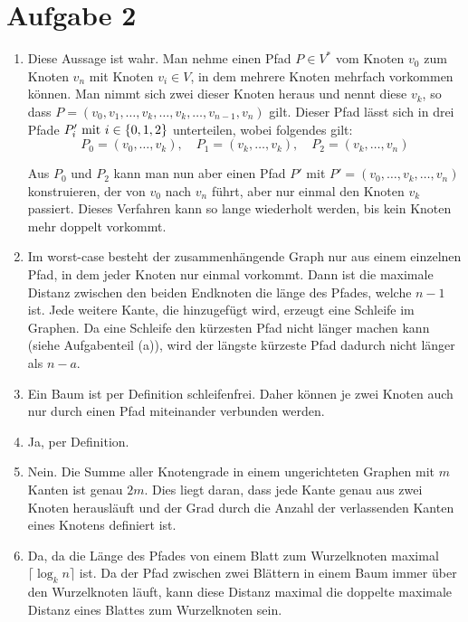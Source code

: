 \documentclass{article}
\begin{document}
\section*{Aufgabe 2}
\begin{enumerate}[label=(\alph*)]
\item Diese Aussage ist wahr. Man nehme einen Pfad \(P \in V^*\) vom Knoten
\(v_0\) zum Knoten \(v_n\) mit Knoten \(v_i \in V\), in dem mehrere Knoten
mehrfach vorkommen können. Man nimmt sich zwei dieser Knoten heraus und nennt
diese \(v_k\), so dass \(P = \left( v_0, v_1, \dots , v_k , \dots , v_k , \dots
, v_{n-1}, v_n\right)\) gilt. Dieser Pfad lässt sich in drei Pfade \(P'_i$ mit
$i \in \{0,1,2\}\) unterteilen, wobei folgendes gilt:
\[
	P_0 = \left( v_0 , \dots , v_k \right), \quad
	P_1 = \left( v_k , \dots , v_k \right), \quad
	P_2 = \left( v_k , \dots , v_n \right)
\]

Aus \(P_0\) und \(P_2\) kann man nun aber einen Pfad \(P'\) mit \(P' = \left(
v_0 , \dots , v_k , \dots , v_n \right) \) konstruieren, der von \(v_0\) nach
\(v_n\) führt, aber nur einmal den Knoten \(v_k\) passiert. Dieses Verfahren
kann so lange wiederholt werden, bis kein Knoten mehr doppelt vorkommt.

\item Im worst-case besteht der zusammenhängende Graph nur aus einem einzelnen
Pfad, in dem jeder Knoten nur einmal vorkommt. Dann ist die maximale Distanz
zwischen den beiden Endknoten die länge des Pfades, welche \(n-1\) ist. Jede
weitere Kante, die hinzugefügt wird, erzeugt eine Schleife im Graphen. Da eine
Schleife den kürzesten Pfad nicht länger machen kann (siehe Aufgabenteil (a)),
wird der längste kürzeste Pfad dadurch nicht länger als \(n-a\).

\item Ein Baum ist per Definition schleifenfrei. Daher können je zwei Knoten
auch nur durch einen Pfad miteinander verbunden werden.

\item Ja, per Definition.

\item Nein. Die Summe aller Knotengrade in einem ungerichteten Graphen mit \(m\)
Kanten ist genau \(2m\). Dies liegt daran, dass jede Kante genau aus zwei Knoten
herausläuft und der Grad durch die Anzahl der verlassenden Kanten eines Knotens
definiert ist.

\item Da, da die Länge des Pfades von einem Blatt zum Wurzelknoten maximal
\(\lceil \log_k n \rceil\) ist. Da der Pfad zwischen zwei Blättern in einem Baum
immer über den Wurzelknoten läuft, kann diese Distanz maximal die doppelte
maximale Distanz eines Blattes zum Wurzelknoten sein.


\end{enumerate}
\end{document}
